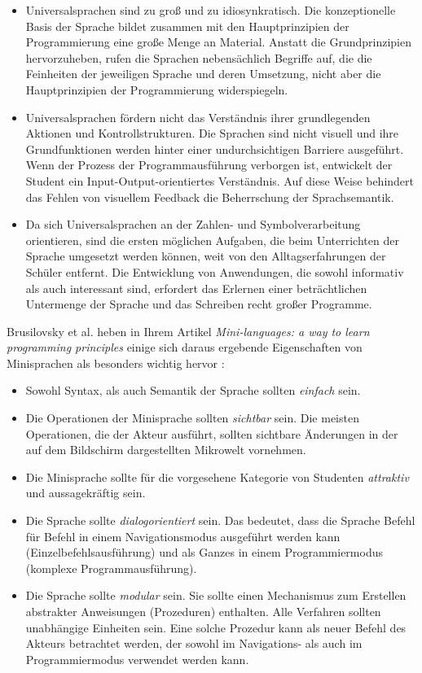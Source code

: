 \begin{itemize}
    \item Universalsprachen sind zu groß und zu idiosynkratisch. Die konzeptionelle Basis der Sprache bildet zusammen mit den Hauptprinzipien der Programmierung eine große Menge an Material. Anstatt die Grundprinzipien hervorzuheben, rufen die Sprachen nebensächlich Begriffe auf, die die Feinheiten der jeweiligen Sprache und deren Umsetzung, nicht aber die Hauptprinzipien der Programmierung widerspiegeln.
    \item Universalsprachen fördern nicht das Verständnis ihrer grundlegenden Aktionen und Kontrollstrukturen. Die Sprachen sind nicht visuell und ihre Grundfunktionen werden hinter einer undurchsichtigen Barriere ausgeführt. Wenn der Prozess der Programmausführung verborgen ist, entwickelt der Student ein Input-Output-orientiertes Verständnis. Auf diese Weise behindert das Fehlen von visuellem Feedback die Beherrschung der Sprachsemantik.
    \item Da sich Universalsprachen an der Zahlen- und Symbolverarbeitung orientieren, sind die ersten möglichen Aufgaben, die beim Unterrichten der Sprache umgesetzt werden können, weit von den Alltagserfahrungen der Schüler entfernt. Die Entwicklung von Anwendungen, die sowohl informativ als auch interessant sind, erfordert das Erlernen einer beträchtlichen Untermenge der Sprache und das Schreiben recht großer Programme.
\end{itemize}

Brusilovsky et al. heben in Ihrem Artikel \textit{Mini-languages: a way to learn programming principles} einige sich daraus ergebende Eigenschaften von Minisprachen als besonders wichtig hervor \cite[73-74]{brusilovsky1997}:

\begin{itemize}
    \item Sowohl Syntax, als auch Semantik der Sprache sollten \emph{einfach} sein.
    \item Die Operationen der Minisprache sollten \emph{sichtbar} sein. Die meisten Operationen, die der Akteur ausführt, sollten sichtbare Änderungen in der auf dem Bildschirm dargestellten Mikrowelt vornehmen.
    \item Die Minisprache sollte für die vorgesehene Kategorie von Studenten \emph{attraktiv} und aussagekräftig sein.
    \item Die Sprache sollte \emph{dialogorientiert} sein. Das bedeutet, dass die Sprache Befehl für Befehl in einem Navigationsmodus ausgeführt werden kann (Einzelbefehlsausführung) und als Ganzes in einem Programmiermodus (komplexe Programmausführung).
    \item Die Sprache sollte \emph{modular} sein. Sie sollte einen Mechanismus zum Erstellen abstrakter Anweisungen (Prozeduren) enthalten. Alle Verfahren sollten unabhängige Einheiten sein. Eine solche Prozedur kann als neuer Befehl des Akteurs betrachtet werden, der sowohl im Navigations- als auch im Programmiermodus verwendet werden kann.
\end{itemize}


